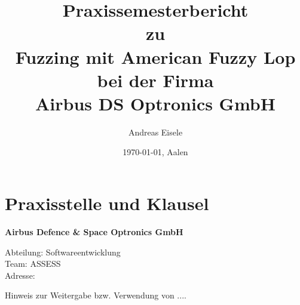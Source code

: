 \documentclass[12pt,a4paper]{scrreprt}
\begin{document}

\begin{titlepage}

\centering

\title{Praxissemesterbericht \\  
\vspace{1cm} \large zu \\ 
\vspace{1cm}  Fuzzing mit American Fuzzy Lop \\
\vspace{0.5cm} bei der Firma \\
\vspace{0.5cm} Airbus DS Optronics GmbH \vspace{1.5cm}}



\author{Andreas Eisele}

\vspace{1.5cm}

\date{\today{}, Aalen}
\maketitle
\end{titlepage}


\tableofcontents

\newpage
\renewcommand{\thesection}{\arabic{section}}


\chapter{Praxisstelle und Klausel}

\textbf{Airbus Defence \& Space Optronics GmbH}

\begin{minipage}{1\textwidth}

	Abteilung: \hspace{1cm} Softwareentwicklung \\
	Team: \hspace{1cm} ASSESS \\
	Adresse: 

\end{minipage}

\vspace{3cm}

\begin{minipage}{1\textwidth}

Hinweis zur Weitergabe bzw. Verwendung von ....

\end{minipage}
\end{document}
